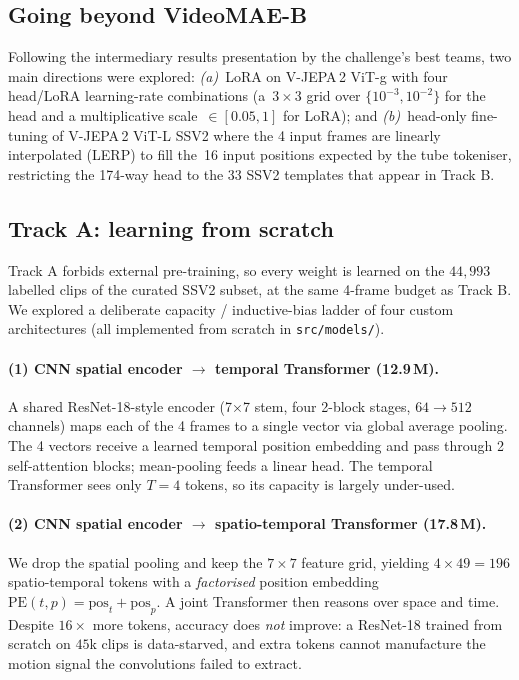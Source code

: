 \documentclass[10pt,twocolumn,letterpaper]{article}
\begin{document}
\subsection{Going beyond VideoMAE-B}
\label{sec:method:beyond}
Following the intermediary results presentation by the challenge's best teams, two main directions were explored:
\emph{(a)}~LoRA on V-JEPA\,2 ViT-g with four head/LoRA learning-rate
combinations (a~$3\times 3$ grid over $\{10^{-3},10^{-2}\}$ for the head
and a multiplicative scale~$\in[0.05,1]$ for LoRA); and
\emph{(b)}~head-only fine-tuning of V-JEPA\,2 ViT-L SSV2 where the 4
input frames are linearly interpolated (LERP) to fill the~16 input
positions expected by the tube tokeniser, restricting the
174-way head to the 33 SSV2 templates that appear in Track B.

\subsection{Track A: learning from scratch}
\label{sec:method:trackA}

Track A forbids external pre-training, so every weight is learned on the
$44{,}993$ labelled clips of the curated SSV2 subset, at the same 4-frame
budget as Track B. We explored a deliberate capacity / inductive-bias
ladder of four custom architectures (all implemented from scratch in
\texttt{src/models/}).

\paragraph{(1) CNN spatial encoder $\to$ temporal Transformer (12.9\,M).}
A shared ResNet-18-style encoder (7$\times$7 stem, four 2-block stages,
$64\!\to\!512$ channels) maps each of the 4 frames to a single vector via
global average pooling. The 4 vectors receive a learned temporal position
embedding and pass through 2 self-attention blocks; mean-pooling feeds a
linear head. The temporal Transformer sees only $T{=}4$ tokens, so its
capacity is largely under-used.

\paragraph{(2) CNN spatial encoder $\to$ spatio-temporal Transformer (17.8\,M).}
We drop the spatial pooling and keep the $7\times7$ feature grid, yielding
$4\times49 = 196$ spatio-temporal tokens with a \emph{factorised} position
embedding $\mathrm{PE}(t,p)=\mathrm{pos}_t+\mathrm{pos}_p$. A joint
Transformer then reasons over space and time. Despite $16\times$ more
tokens, accuracy does \emph{not} improve: a ResNet-18 trained from scratch
on $45$k clips is data-starved, and extra tokens cannot manufacture the
motion signal the convolutions failed to extract.
\end{document}
